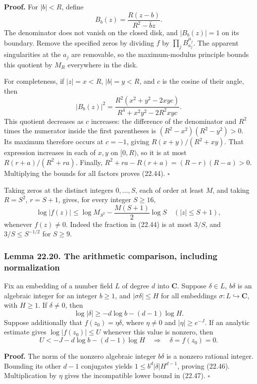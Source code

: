 \documentclass[
  11pt,
  a4paper,
]{article}
\begin{document}
\textbf{Proof.} For \(|b|<R\), define \[
 B_b(z)=\frac{R(z-b)}{R^2-\bar b z}.
\] The denominator does not vanish on the closed disk, and
\(|B_b(z)|=1\) on its boundary. Remove the specified zeros by dividing
\(f\) by \(\prod_jB_{a_j}^{\mu_j}\). The apparent singularities at the
\(a_j\) are removable, so the maximum-modulus principle bounds this
quotient by \(M_R\) everywhere in the disk.

For completeness, if \(|z|=x<R\), \(|b|=y<R\), and \(c\) is the cosine
of their angle, then \[
 |B_b(z)|^2=\frac{R^2(x^2+y^2-2xyc)}{R^4+x^2y^2-2R^2xyc}.
\] This quotient decreases as \(c\) increases: the difference of the
denominator and \(R^2\) times the numerator inside the first parentheses
is \((R^2-x^2)(R^2-y^2)>0\). Its maximum therefore occurs at \(c=-1\),
giving \(R(x+y)/(R^2+xy)\). That expression increases in each of \(x,y\)
on \([0,R)\), so it is at most \(R(r+a)/(R^2+ra)\). Finally,
\(R^2+ra-R(r+a)=(R-r)(R-a)>0\). Multiplying the bounds for all factors
proves (22.44). \(\square\)

Taking zeros at the distinct integers \(0,\ldots,S\), each of order at
least \(M\), and taking \(R=S^2\), \(r=S+1\), gives, for every integer
\(S\ge16\), \[
 \log|f(z)|\le\log M_{S^2}-\frac{M(S+1)}2\log S
 \quad (|z|\le S+1),
 \tag{22.45}
\] whenever \(f(z)\ne0\). Indeed the fraction in (22.44) is at most
\(3/S\), and \(3/S\le S^{-1/2}\) for \(S\ge9\).

\subsubsection{Lemma 22.20. The arithmetic comparison, including
normalization}\label{lemma-22.20.-the-arithmetic-comparison-including-normalization}

Fix an embedding of a number field \(L\) of degree \(d\) into
\(\mathbf C\). Suppose \(\delta\in L\), \(b\delta\) is an algebraic
integer for an integer \(b\ge1\), and \(|\sigma\delta|\le H\) for all
embeddings \(\sigma:L\hookrightarrow\mathbf C\), with \(H\ge1\). If
\(\delta\ne0\), then \[
 \log|\delta|\ge-d\log b-(d-1)\log H.
 \tag{22.46}
\] Suppose additionally that \(f(z_0)=\eta\delta\), where \(\eta\ne0\)
and \(|\eta|\ge e^{-J}\). If an analytic estimate gives
\(\log|f(z_0)|\le U\) whenever this value is nonzero, then \[
 U<-J-d\log b-(d-1)\log H
 \quad\Longrightarrow\quad \delta=f(z_0)=0.
 \tag{22.47}
\]

\textbf{Proof.} The norm of the nonzero algebraic integer \(b\delta\) is
a nonzero rational integer. Bounding its other \(d-1\) conjugates yields
\(1\le b^d|\delta|H^{d-1}\), proving (22.46). Multiplication by \(\eta\)
gives the incompatible lower bound in (22.47). \(\square\)
\end{document}
